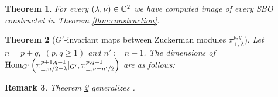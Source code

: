 \documentclass[12pt]{article} %
\newtheorem{theorem}{Theorem}
\newcommand{\Hom}{\mbox{\normalfont Hom}}
\newtheorem{remark}[theorem]{Remark}
\theoremstyle{definition}
\theoremstyle{exampstyle} \newtheorem{examp}[theorem]{Theorem}
\begin{document}
	\begin{theorem}
		For every $(\lambda,\nu)\in\mathbb{C}^2$ we have computed image of every SBO constructed in Theorem \ref{thm:construction}.
	\end{theorem}
\begin{theorem}[$G'$-invariant maps between Zuckerman modules $\pi_{\pm,\lambda}^{p,q}$]\label{thm:Aq}
	Let $n=p+q,\;(p,q\ge1)$ and $n':=n-1$.
	The dimensions of $\Hom_{G'}\left(\pi_{\pm,{n}/{2}-\lambda}^{p+1,q+1}\kern-0.3em\mid_{G'} ,\pi_{\pm,\nu-{n'}/{2}}^{p,q+1} \right)$
	are as follows:\newline
{}\\\vspace{\baselineskip}
\end{theorem}
\begin{remark}
Theorem \ref{thm:Aq} generalizes \cite[Thms. 12.1 and 1.3]{kobayashi2015symmetry}.
\end{remark}
\nocite{kobayashi2015program}
\small


\end{document}
